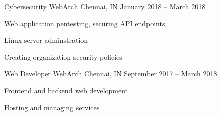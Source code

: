 \documentclass[]{awesome-cv}
\begin{document}
\vspace{-7mm}
\begin{cventries}
	\cventry
	{Cybersecurity}
	{WebArch}
	{Chennai, IN}
	{January 2018 – March 2018}
	{\begin{cvitems}
		\item {Web application pentesting, securing API endpoints}
		\item {Linux server adminstration}
		\item {Creating organization security policies}
		\end{cvitems}}
	\cventry
	{Web Developer}
	{WebArch}
	{Chennai, IN}
	{September 2017 – March 2018}
	{\begin{cvitems}
		\item {Frontend and backend web development}
		\item {Hosting and managing services}
		\end{cvitems}}
\end{cventries}
\end{document}
